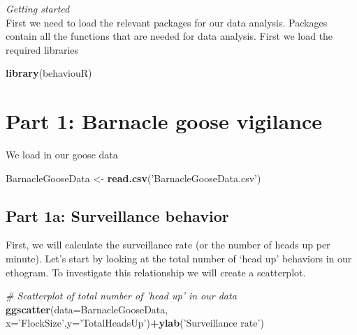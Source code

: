 \documentclass[]{book}
\newenvironment{Shaded}{\begin{snugshade}}{\end{snugshade}}
\newcommand{\CommentTok}[1]{\textcolor[rgb]{0.56,0.35,0.01}{\textit{#1}}}
\newcommand{\DataTypeTok}[1]{\textcolor[rgb]{0.13,0.29,0.53}{#1}}
\newcommand{\KeywordTok}[1]{\textcolor[rgb]{0.13,0.29,0.53}{\textbf{#1}}}
\newcommand{\NormalTok}[1]{#1}
\newcommand{\OperatorTok}[1]{\textcolor[rgb]{0.81,0.36,0.00}{\textbf{#1}}}
\newcommand{\StringTok}[1]{\textcolor[rgb]{0.31,0.60,0.02}{#1}}
\begin{document}
\emph{Getting started}\\
First we need to load the relevant packages for our data analysis. Packages contain all the functions that are needed for data analysis.
First we load the required libraries

\begin{Shaded}
\begin{Highlighting}[]
\KeywordTok{library}\NormalTok{(behaviouR)}
\end{Highlighting}
\end{Shaded}

\hypertarget{part-1-barnacle-goose-vigilance}{%
\section{Part 1: Barnacle goose vigilance}\label{part-1-barnacle-goose-vigilance}}

We load in our goose data

\begin{Shaded}
\begin{Highlighting}[]
\NormalTok{BarnacleGooseData <-}\StringTok{ }\KeywordTok{read.csv}\NormalTok{(}\StringTok{'BarnacleGooseData.csv'}\NormalTok{)}
\end{Highlighting}
\end{Shaded}

\hypertarget{part-1a-surveillance-behavior}{%
\subsection{Part 1a: Surveillance behavior}\label{part-1a-surveillance-behavior}}

First, we will calculate the surveillance rate (or the number of heads up per minute). Let's start by looking at the total number of `head up' behaviors in our ethogram. To investigate this relationship we will create a scatterplot.

\begin{Shaded}
\begin{Highlighting}[]
\CommentTok{# Scatterplot of total number of 'head up' in our data}
\KeywordTok{ggscatter}\NormalTok{(}\DataTypeTok{data=}\NormalTok{BarnacleGooseData,}
          \DataTypeTok{x=}\StringTok{'FlockSize'}\NormalTok{,}\DataTypeTok{y=}\StringTok{'TotalHeadsUp'}\NormalTok{)}\OperatorTok{+}\KeywordTok{ylab}\NormalTok{(}\StringTok{'Surveillance rate'}\NormalTok{)}
\end{Highlighting}
\end{Shaded}
\end{document}
